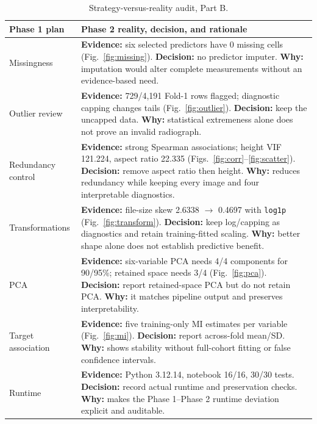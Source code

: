 \documentclass[conference]{IEEEtran}
\begin{document}
\begin{table}[!t]
\caption{Strategy-versus-reality audit, Part B.}
\label{tab:auditB}
\centering
\footnotesize
\setlength{\tabcolsep}{2pt}
\begin{tabularx}{\columnwidth}{@{}p{}X@{}}
\toprule
Phase 1 plan & Phase 2 reality, decision, and rationale\\
\midrule
Missingness & \textbf{Evidence:} six selected predictors have 0 missing cells (Fig.~\ref{fig:missing}). \textbf{Decision:} no predictor imputer. \textbf{Why:} imputation would alter complete measurements without an evidence-based need.\\
\addlinespace
Outlier review & \textbf{Evidence:} 729/4,191 Fold-1 rows flagged; diagnostic capping changes tails (Fig.~\ref{fig:outlier}). \textbf{Decision:} keep the uncapped data. \textbf{Why:} statistical extremeness alone does not prove an invalid radiograph.\\
\addlinespace
Redundancy control & \textbf{Evidence:} strong Spearman associations; height VIF 121.224, aspect ratio 22.335 (Figs.~\ref{fig:corr}--\ref{fig:scatter}). \textbf{Decision:} remove aspect ratio then height. \textbf{Why:} reduces redundancy while keeping every image and four interpretable diagnostics.\\
\addlinespace
Transformations & \textbf{Evidence:} file-size skew 2.6338 $\rightarrow$ 0.4697 with \texttt{log1p} (Fig.~\ref{fig:transform}). \textbf{Decision:} keep log/capping as diagnostics and retain training-fitted scaling. \textbf{Why:} better shape alone does not establish predictive benefit.\\
\addlinespace
PCA & \textbf{Evidence:} six-variable PCA needs 4/4 components for 90/95\%; retained space needs 3/4 (Fig.~\ref{fig:pca}). \textbf{Decision:} report retained-space PCA but do not retain PCA. \textbf{Why:} it matches pipeline output and preserves interpretability.\\
\addlinespace
Target association & \textbf{Evidence:} five training-only MI estimates per variable (Fig.~\ref{fig:mi}). \textbf{Decision:} report across-fold mean/SD. \textbf{Why:} shows stability without full-cohort fitting or false confidence intervals.\\
\addlinespace
Runtime & \textbf{Evidence:} Python 3.12.14, notebook 16/16, 30/30 tests. \textbf{Decision:} record actual runtime and preservation checks. \textbf{Why:} makes the Phase 1--Phase 2 runtime deviation explicit and auditable.\\
\bottomrule
\end{tabularx}
\end{table}
\end{document}
